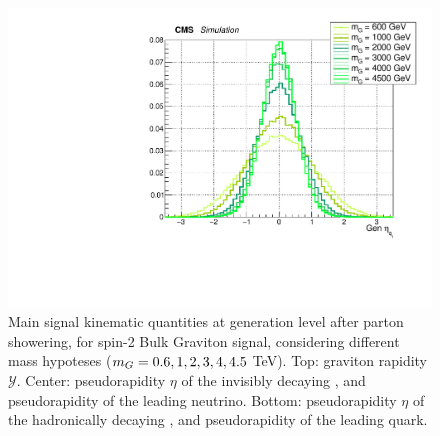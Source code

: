 \begin{figure}[!htb]
\begin{center}
     \includegraphics[width=.495\textwidth]{Gen_v9/XZZInv_g_Had1Eta.pdf}%
   \end{center}
   \caption{Main signal kinematic quantities at generation level after parton showering, for spin-2 Bulk Graviton signal, considering different mass hypoteses ($m_{G} = 0.6, 1, 2, 3, 4, 4.5$ TeV). Top: graviton rapidity $\mathcal{Y}$. Center: pseudorapidity $\eta$ of the invisibly decaying \Z, and pseudorapidity of the leading neutrino. Bottom: pseudorapidity $\eta$ of the hadronically decaying \Z, and pseudorapidity of the leading quark.}
   \label{fig:genGravSignal2}
 \end{figure}

